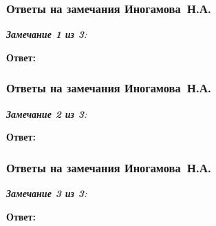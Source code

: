\begin{frame}
	\frametitle{Ответы на замечания Иногамова~Н.А.}
	\small{\textit{\textbf{Замечание 1 из 3}: }}
	
	\hfill
	
	\textbf{Ответ:}
	
	
\end{frame}

\begin{frame}
	\frametitle{Ответы на замечания Иногамова~Н.А.}
	\small{\textit{\textbf{Замечание 2 из 3}: }}
	
	\hfill
	
	\textbf{Ответ:}
	
	
\end{frame}

\begin{frame}
	\frametitle{Ответы на замечания Иногамова~Н.А.}
	\small{\textit{\textbf{Замечание 3 из 3}: }}
	
	\hfill
	
	\textbf{Ответ:}
	
	
\end{frame}